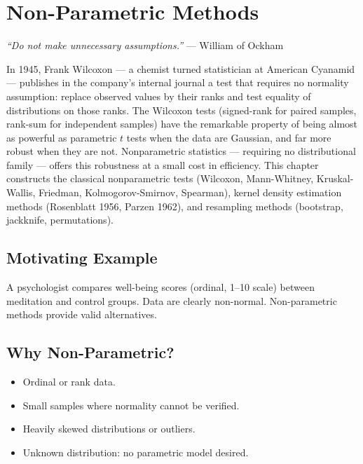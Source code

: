 \chapter{Non-Parametric Methods}
\label{ch:nonparametric}

\begin{center}
\textit{``Do not make unnecessary assumptions.''} --- William of Ockham
\end{center}

In 1945, Frank Wilcoxon --- a chemist turned statistician at American Cyanamid --- publishes in the company's internal journal a test that requires no normality assumption: replace observed values by their ranks and test equality of distributions on those ranks. The Wilcoxon tests (signed-rank for paired samples, rank-sum for independent samples) have the remarkable property of being almost as powerful as parametric $t$ tests when the data are Gaussian, and far more robust when they are not. Nonparametric statistics --- requiring no distributional family --- offers this robustness at a small cost in efficiency. This chapter constructs the classical nonparametric tests (Wilcoxon, Mann-Whitney, Kruskal-Wallis, Friedman, Kolmogorov-Smirnov, Spearman), kernel density estimation methods (Rosenblatt 1956, Parzen 1962), and resampling methods (bootstrap, jackknife, permutations).

\section{Motivating Example}
A psychologist compares well-being scores (ordinal, 1--10 scale) between meditation and control groups. Data are clearly non-normal. Non-parametric methods provide valid alternatives.

\section{Why Non-Parametric?}

\begin{itemize}
\item Ordinal or rank data.
\item Small samples where normality cannot be verified.
\item Heavily skewed distributions or outliers.
\item Unknown distribution: no parametric model desired.
\end{itemize}

